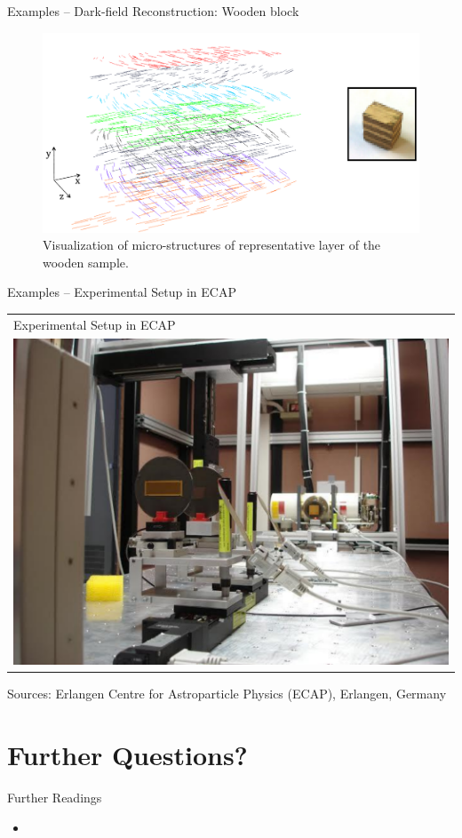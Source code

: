 \begin{frame}{Examples -- Dark-field Reconstruction: Wooden block}
    \begin{figure}
        \centering
        \includegraphics[width=0.6\linewidth]{images/Wooden.pdf}
        \caption[Visualization of micro-structures of the wooden sample.]{Visualization of micro-structures of representative layer of the wooden sample. \label{images:Wooden3D}}
    \end{figure}
\end{frame}

\begin{frame}{Examples -- Experimental Setup in ECAP}
    \begin{center}
        \begin{tabular}{l}
            Experimental Setup in ECAP \\
            \includegraphics[width=0.5\linewidth]{images/setup.pdf}
        \end{tabular}
    \end{center}
    \begin{flushright}
        \scriptsize Sources: Erlangen Centre for Astroparticle Physics (ECAP), Erlangen, Germany
    \end{flushright}
\end{frame}

\section{Further Questions?}

\begin{frame}[t]{Further Readings}
    \begin{itemize}
        \item {}
    \end{itemize}

\end{frame}


